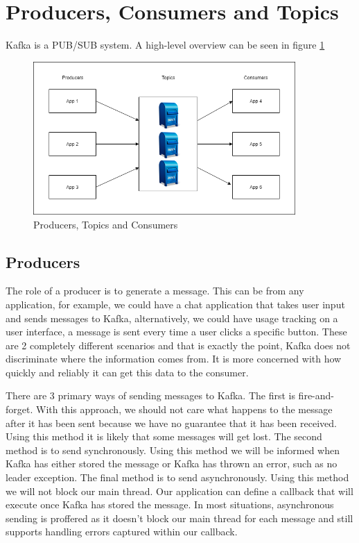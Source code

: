 \section{Producers, Consumers and Topics}

Kafka is a PUB/SUB system. A high-level overview can be seen in figure \ref{fig:producers-topics-consumers}

\begin{figure}[H]
  \centering
  \includegraphics[scale=0.5,width=100mm]{./images/kafka-producrs-consumers-topics.png}
  \caption{Producers, Topics and Consumers}
  \label{fig:producers-topics-consumers}
\end{figure}

\subsection{Producers}

The role of a producer is to generate a message. This can be from any application, for example, we could have a chat application that takes user input and sends messages to Kafka, alternatively, we could have usage tracking on a user interface, a message is sent every time a user clicks a specific button. These are 2 completely different scenarios and that is exactly the point, Kafka does not discriminate where the information comes from. It is more concerned with how quickly and reliably it can get this data to the consumer.

There are 3 primary ways of sending messages to Kafka. The first is fire-and-forget. With this approach, we should not care what happens to the message after it has been sent because we have no guarantee that it has been received. Using this method it is likely that some messages will get lost. The second method is to send synchronously. Using this method we will be informed when Kafka has either stored the message or Kafka has thrown an error, such as no leader exception. The final method is to send asynchronously. Using this method we will not block our main thread. Our application can define a callback that will execute once Kafka has stored the message. In most situations, asynchronous sending is proffered as it doesn't block our main thread for each message and still supports handling errors captured within our callback.

